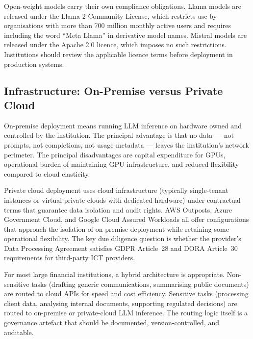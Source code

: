 \begin{remark}
Open-weight models carry their own compliance obligations. Llama models are released under the Llama 2 Community License, which restricts use by organisations with more than 700 million monthly active users and requires including the word ``Meta Llama'' in derivative model names. Mistral models are released under the Apache 2.0 licence, which imposes no such restrictions. Institutions should review the applicable licence terms before deployment in production systems.
\end{remark}

\subsection{Infrastructure: On-Premise versus Private Cloud}
\label{sec:ch15-infrastructure}

On-premise deployment means running LLM inference on hardware owned and controlled by the institution. The principal advantage is that no data — not prompts, not completions, not usage metadata — leaves the institution's network perimeter. The principal disadvantages are capital expenditure for GPUs, operational burden of maintaining GPU infrastructure, and reduced flexibility compared to cloud elasticity.

Private cloud deployment uses cloud infrastructure (typically single-tenant instances or virtual private clouds with dedicated hardware) under contractual terms that guarantee data isolation and audit rights. AWS Outposts, Azure Government Cloud, and Google Cloud Assured Workloads all offer configurations that approach the isolation of on-premise deployment while retaining some operational flexibility. The key due diligence question is whether the provider's Data Processing Agreement satisfies GDPR Article~28 and DORA Article~30 requirements for third-party ICT providers.

For most large financial institutions, a hybrid architecture is appropriate. Non-sensitive tasks (drafting generic communications, summarising public documents) are routed to cloud APIs for speed and cost efficiency. Sensitive tasks (processing client data, analysing internal documents, supporting regulated decisions) are routed to on-premise or private-cloud LLM inference. The routing logic itself is a governance artefact that should be documented, version-controlled, and auditable.

